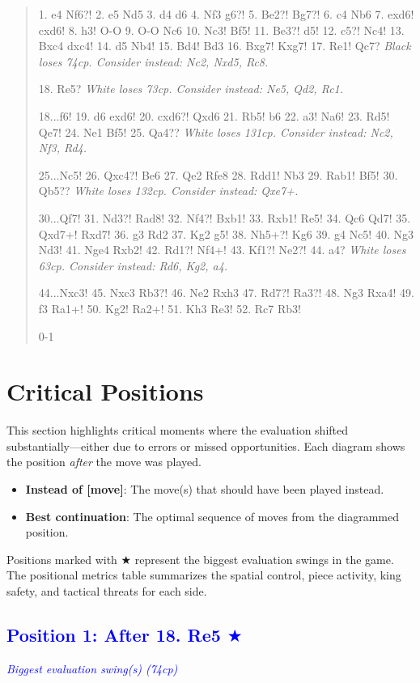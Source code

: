 \documentclass[11pt]{book}
\begin{document}
\begin{quote}
1. e4 Nf6?!
2. e5 Nd5
3. d4 d6
4. Nf3 g6?!
5. Be2?! Bg7?!
6. c4 Nb6
7. exd6! cxd6!
8. h3! O-O
9. O-O Nc6
10. Nc3! Bf5!
11. Be3?! d5!
12. c5?! Nc4!
13. Bxc4 dxc4!
14. d5 Nb4!
15. Bd4! Bd3
16. Bxg7! Kxg7!
17. Re1! Qc7?
\textit{Black loses 74cp. Consider instead: Nc2, Nxd5, Rc8.}

18. Re5?
\textit{White loses 73cp. Consider instead: Ne5, Qd2, Rc1.}

18...f6!
19. d6 exd6!
20. cxd6?! Qxd6
21. Rb5! b6
22. a3! Na6!
23. Rd5! Qe7!
24. Ne1 Bf5!
25. Qa4??
\textit{White loses 131cp. Consider instead: Nc2, Nf3, Rd4.}

25...Nc5!
26. Qxc4?! Be6
27. Qe2 Rfe8
28. Rdd1! Nb3
29. Rab1! Bf5!
30. Qb5??
\textit{White loses 132cp. Consider instead: Qxe7+.}

30...Qf7!
31. Nd3?! Rad8!
32. Nf4?! Bxb1!
33. Rxb1! Re5!
34. Qc6 Qd7!
35. Qxd7+! Rxd7!
36. g3 Rd2
37. Kg2 g5!
38. Nh5+?! Kg6
39. g4 Nc5!
40. Ng3 Nd3!
41. Nge4 Rxb2!
42. Rd1?! Nf4+!
43. Kf1?! Ne2?!
44. a4?
\textit{White loses 63cp. Consider instead: Rd6, Kg2, a4.}

44...Nxc3!
45. Nxc3 Rb3?!
46. Ne2 Rxh3
47. Rd7?! Ra3?!
48. Ng3 Rxa4!
49. f3 Ra1+!
50. Kg2! Ra2+!
51. Kh3 Re3!
52. Rc7 Rb3!

0-1
\end{quote}

\section{Critical Positions}

This section highlights critical moments where the evaluation shifted substantially---either due to errors or missed opportunities. Each diagram shows the position \emph{after} the move was played.

\begin{itemize}
\item \textbf{Instead of [move]}: The move(s) that should have been played instead.
\item \textbf{Best continuation}: The optimal sequence of moves from the diagrammed position.
\end{itemize}

Positions marked with {\color{blue}$\bigstar$} represent the biggest evaluation swings in the game. The positional metrics table summarizes the spatial control, piece activity, king safety, and tactical threats for each side.

\subsection*{\textcolor{blue}{Position 1: After 18. Re5 $\bigstar$}}
\textit{\textcolor{blue}{Biggest evaluation swing(s) (74cp)}}
\end{document}
